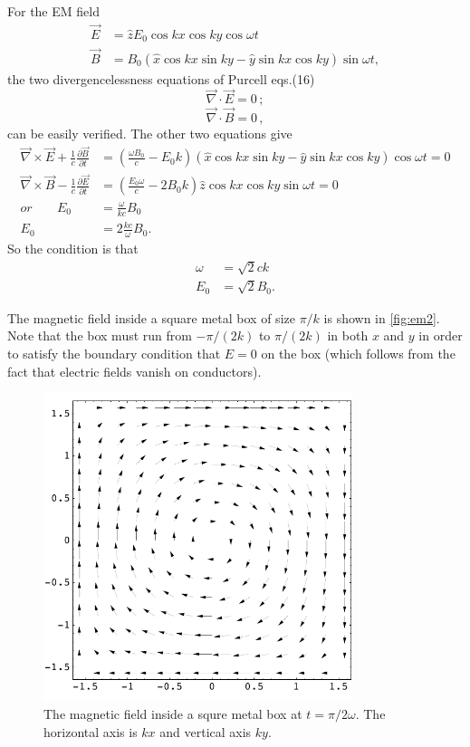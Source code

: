 \documentclass[makesolutionspdf]{esg8022pset}
\begin{document}
\begin{solution}
  For the EM field
  \begin{align}
  \vec{E} &= \hat{z}E_0 \cos kx\cos ky\cos \omega t\\
  \vec{B} &=
  B_0(\hat{x}\cos kx\sin ky-\hat{y}\sin kx\cos ky)\sin \omega t, 
  \end{align}
  the two divergencelessness equations of Purcell eqs.(16) 
  \[ \vec{\nabla}\cdot\vec{E}=0 \,;\]
  \[ \vec{\nabla}\cdot\vec{B}=0 \,,\]
  can be easily verified.  The other two equations give
  \begin{align}
  \vec{\nabla}\times\vec{E}+\frac{1}{c}\frac{\partial \vec{B}}{\partial
  t} &= (\frac{\omega B_0}{c}-E_0 k)(\hat{x}\cos kx\sin ky
  -\hat{y}\sin kx \cos ky)\cos \omega t =0\nonumber\\
  \vec{\nabla}\times\vec{B}-\frac{1}{c}\frac{\partial \vec{E}}{\partial
  t} &= (\frac{E_0\omega}{c}-2B_0 k)\hat{z}\cos kx \cos ky \sin \omega
  t =0\nonumber\\
  or\;\;\;\;\;\;\; E_0 &= \frac{\omega}{kc}B_0\\
  E_0 &= 2\frac{kc}{\omega}B_0.
  \end{align}
  So the condition is that 
  \begin{align}
  \omega &= \sqrt{2} ck\\
  E_0 &= \sqrt{2} B_0.
  \end{align}

  The magnetic field inside a square metal box of size $\pi/k$ is shown
  in \autoref{fig:em2}.  Note that the box must run from $-\pi/(2k)$ to
  $\pi/(2k)$ in both $x$ and $y$ in order to satisfy the boundary
  condition that $E = 0$ on the box (which follows from the fact that
  electric fields vanish on conductors).

  \begin{figure}[H]
    \centering
    \includegraphics[width = 9cm]{em2}
    \caption{The magnetic field inside a squre metal box at
      $t=\pi/2\omega$.  The horizontal axis is $kx$ and vertical axis $ky$.}
    \label{fig:em2}
  \end{figure}

\end{solution}
\end{document}
